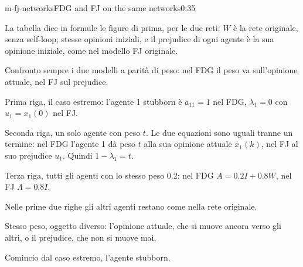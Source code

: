 \begin{slide}{m-fj-networks}{FDG and FJ on the same networks}{0:35 {\color{red}}}
  \begin{discorso}
    \item {\color{red}   } {\color{blue}La tabella dice in formule} le {\color{red}} {\color{blue}figure di prima, per le} due {\color{red}  } {\color{blue}reti:} $W$ è la {\color{red} } rete {\color{red} } {\color{blue}originale, senza self-loop; stesse} opinioni iniziali, e il prejudice di ogni agente è la sua opinione iniziale, come nel modello FJ originale.
    \item Confronto sempre i due modelli a parità di peso: nel FDG il peso va sull'opinione attuale, nel FJ sul prejudice.
    \item Prima riga, il caso estremo: l'agente 1 stubborn è $a_{11}=1$ nel FDG, $\lambda_1=0$ con $u_1=x_1(0)$ nel FJ.
    \item Seconda riga, un solo agente con peso $t$. Le due equazioni sono uguali tranne un termine: nel FDG l'agente 1 dà peso $t$ alla sua opinione attuale $x_1(k)$, nel FJ al suo prejudice $u_1$. Quindi $1-\lambda_1=t$.
    \item Terza riga, tutti gli agenti con lo stesso peso 0.2: nel FDG $A=0.2I+0.8W$, nel FJ $\Lambda=0.8I$.
    \item Nelle prime due righe gli altri agenti restano come nella rete originale.
    \item Stesso peso, oggetto diverso: l'opinione attuale, che si muove ancora verso gli altri, o il prejudice, che non si muove mai.
    \item Comincio dal caso estremo, l'agente stubborn.
  \end{discorso}
\end{slide}

